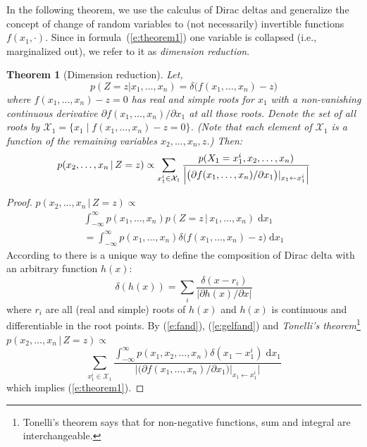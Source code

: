 \documentclass[letterpaper]{article}
\newtheorem{theorem}{Theorem}
\newcommand{\pr}{p}
\newcommand{\dd}{\;\mathrm{d}} %
\begin{document}
In the following theorem, we use the calculus of Dirac deltas and generalize the concept of change of random variables to (not necessarily) invertible functions $f(x_1, \cdot)$.
Since in formula~(\ref{e:theorem1}) one variable is collapsed (i.e., marginalized out), we refer to it as \emph{dimension reduction}. 

\begin{theorem}[Dimension reduction] 
\label{theorem1}
Let, 
\[ 
\pr(Z\!=\!z | x_1, \ldots, x_n) = \delta \big( f(x_1, \ldots, x_n)-z \big)
\]
where $f(x_1, \ldots, x_n) -z = 0$ has real and simple roots for $x_1$ with a non-vanishing continuous derivative
$\partial f(x_1, \ldots, x_n)/\partial x_1$ 
at all those roots.
Denote the set of all roots by 
 $ \mathcal{X}_1 = \{ x_1 \; | \; f(x_1, \ldots, x_n) - z = 0 \} $. 
(Note that each element of $ \mathcal{X}_1 $
 is a function of the remaining variables $ x_2,\dots,x_n,z $.)
 Then:
\begin{equation}\footnotesize
\label{e:theorem1}
p(x_2, \ldots, x_n \,|\, Z=z) \propto 
\sum_{x_1^i \in \mathcal{X}_1} 
\frac{p(X_1=x_1^i, x_2, \ldots, x_n)}
{\Big|\big(\partial f(x_1, \ldots, x_n) / \partial x_1 \big)|_{x_1 \leftarrow x_1^i} \Big|}
\end{equation}
\end{theorem}
\begin{proof} 
{\footnotesize
$p(x_2, \ldots, x_n \,|\, Z=z) \propto$
\begin{multline}
\int_{-\infty}^{\infty}p(x_1, \ldots, x_n)p(Z=z \,|\, x_1, \ldots, x_n) \dd x_1 %
%
\\=\int_{-\infty}^{\infty}p(x_1, \ldots, x_n)
\delta \big( f(x_1, \ldots, x_n) - z \big) \dd x_1 
\label{e:fand}
\end{multline}
}
According to \cite{gel1964generalized}
there is a unique way to define the composition of Dirac delta with 
an arbitrary function $h(x)$:
\begin{equation}
\label{e:gelfand}
\delta(h(x)) = \sum_{i} \frac{\delta(x - r_i)}{|\partial h(x)/\partial x|}
\end{equation}
where $r_i$ are all (real and simple) roots of $h(x)$ and $h(x)$ is continuous and differentiable in the root points. By (\ref{e:fand}), (\ref{e:gelfand})  and 
\emph{Tonelli's theorem}\footnote{Tonelli's theorem says that for non-negative functions, sum and integral are interchangeable.} 
$\pr(x_2, \ldots, x_n \,|\, Z = z) \propto$
\begin{equation*}%
\sum_{x_1^i \in \mathcal{X}_1} 
\frac{\int_{-\infty}^{\infty} p(x_1, x_2, \ldots, x_n)  \delta(x_1 - x_1^i) \dd x_1}
{\Big|\big(\partial f(x_1, \ldots, x_n) / \partial x_1 \big)|_{x_1 \leftarrow x_1^i} \Big|}
\end{equation*}
which implies (\ref{e:theorem1}).
\end{proof}
%
\end{document}
